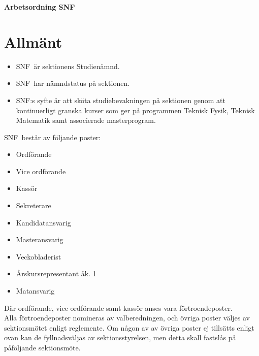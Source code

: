 

\renewcommand{\dateseparator}{-} %

\renewcommand{\forening}{SNF}

\begin{center}
\LARGE{\textbf{Arbetsordning SNF}}
\end{center}





\section{Allmänt}
\begin{itemize}
\item \forening \ är sektionens Studienämnd.\
\item \forening \ har nämndstatus på sektionen.
\item \forening:s syfte är att sköta studiebevakningen på sektionen genom att kontinuerligt granska kurser som ger på programmen Teknisk Fysik, Teknisk Matematik samt associerade masterprogram.
\end{itemize}

\forening \ består av följande poster:
    \begin{itemize}
        \item Ordförande
        \item Vice ordförande
        \item Kassör
        \item Sekreterare
        \item Kandidatansvarig
        \item Masteransvarig
        \item Veckobladerist
        \item Årskursrepresentant åk. 1
        \item Matansvarig
    \end{itemize}

Där ordförande, vice ordförande samt kassör anses vara förtroendeposter. \\

Alla förtroendeposter nomineras av valberedningen, och övriga poster väljes av sektionsmötet enligt reglemente. Om någon av av övriga poster ej tillsätts enligt ovan kan de fyllnadsväljas av sektionsstyrelsen, men detta skall fastslås på påföljande sektionsmöte.

